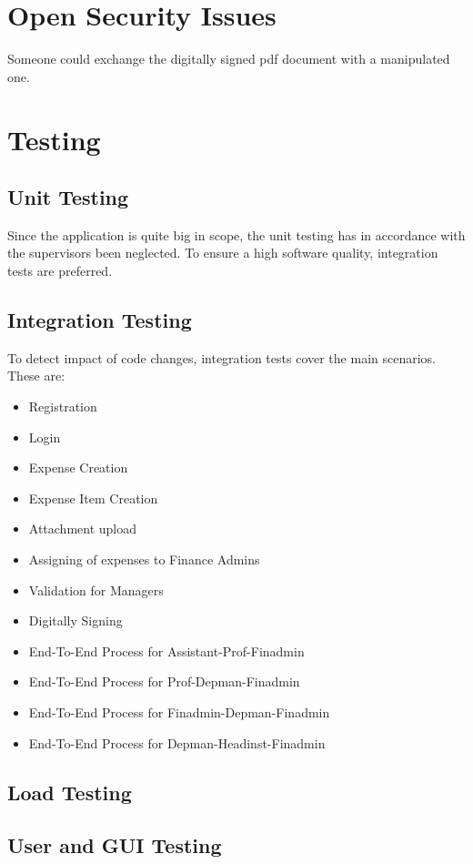 \section{Open Security Issues}
Someone could exchange the digitally signed pdf document with a manipulated one.



\section{Testing}

\subsection{Unit Testing}
Since the application is quite big in scope, the unit testing has in accordance with the supervisors been neglected. To ensure a high software quality, integration tests are preferred.

\subsection{Integration Testing}
To detect impact of code changes, integration tests cover the main scenarios. These are:
\begin{itemize}
	\item Registration
	\item Login
	\item Expense Creation
	\item Expense Item Creation
	\item Attachment upload
	\item Assigning of expenses to Finance Admins
	\item Validation for Managers
	\item Digitally Signing
	\item End-To-End Process for Assistant-Prof-Finadmin
	\item End-To-End Process for Prof-Depman-Finadmin
	\item End-To-End Process for Finadmin-Depman-Finadmin
	\item End-To-End Process for Depman-Headinst-Finadmin
\end{itemize}


\subsection{Load Testing}

\subsection{User and GUI Testing}
